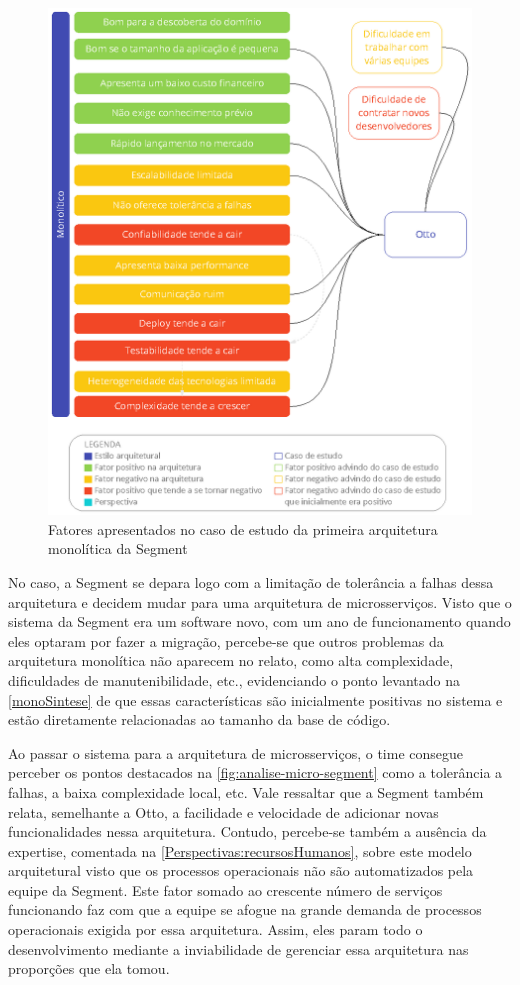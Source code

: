 \begin{figure}[h]
  \centering
  \includegraphics[keepaspectratio=true,scale=1]{figuras/monoOtto.eps}
  \caption{Fatores apresentados no caso de estudo da primeira arquitetura monolítica da Segment\label{fig:analise-mono-segment-1}}
\end{figure}

No caso, a Segment se depara logo com a limitação de tolerância a falhas dessa arquitetura e decidem
mudar para uma arquitetura de microsserviços. Visto que o sistema da Segment era um software novo,
com um ano de funcionamento quando eles optaram por fazer a migração, percebe-se que outros problemas
da arquitetura monolítica não aparecem no relato, como alta complexidade, dificuldades de
manutenibilidade, etc., evidenciando o ponto levantado na \autoref{monoSintese} de que essas
características são inicialmente positivas no sistema e estão diretamente relacionadas ao tamanho da
base de código.

Ao passar o sistema para a arquitetura de microsserviços, o time consegue perceber os pontos
destacados na \autoref{fig:analise-micro-segment} como a tolerância a falhas, a baixa complexidade
local, etc. Vale ressaltar que a Segment também relata, semelhante a Otto, a facilidade e velocidade
de adicionar novas funcionalidades nessa arquitetura. Contudo, percebe-se também a ausência da expertise,
comentada na \autoref{Perspectivas:recursosHumanos}, sobre este modelo arquitetural visto que os processos
operacionais não são automatizados pela equipe da Segment. Este fator somado ao crescente número de
serviços funcionando faz com que a equipe se afogue na grande demanda de processos operacionais
exigida por essa arquitetura. Assim, eles param todo o desenvolvimento mediante a inviabilidade de
gerenciar essa arquitetura nas proporções que ela tomou.

